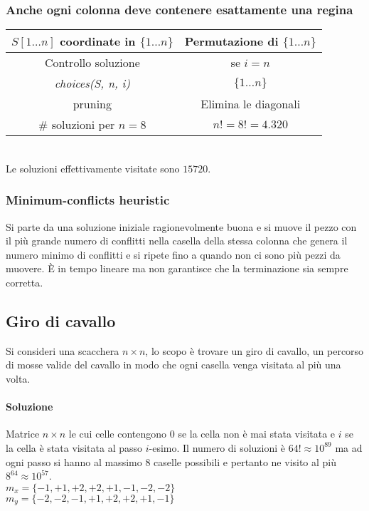 \subsubsection{Anche ogni colonna deve contenere esattamente una regina}
\begin{tabular}{|c|c|}
	\hline
	$S[1\dots n]$ coordinate in $\{1\dots n\}$ & Permutazione di $\{1\dots n\}$\\
	\hline
	Controllo soluzione & se $i = n$ \\
	\hline
	\emph{choices(S, n, i)} & $\{1\dots n\}$\\
	\hline
	pruning & Elimina le diagonali\\
	\hline
	$\#$ soluzioni per $n=8$ & $n! = 8! = 4.320$\\
	\hline
\end{tabular}\\
Le soluzioni effettivamente visitate sono $15720$.
\subsubsection{Minimum-conflicts heuristic}
Si parte da una soluzione iniziale ragionevolmente buona e si muove il pezzo con il pi\`u grande numero di conflitti nella casella della stessa colonna che genera il numero minimo di 
conflitti e si ripete fino a quando non ci sono pi\`u pezzi da muovere. \`E in tempo lineare ma non garantisce che la terminazione sia sempre corretta.\\

\subsection{Giro di cavallo}
Si consideri una scacchera $n\times n$, lo scopo \`e trovare un giro di cavallo, un percorso di mosse valide del cavallo in modo che ogni casella venga visitata al pi\`u una volta.
\paragraph{Soluzione}
Matrice $n\times n$ le cui celle contengono $0$ se la cella non \`e mai stata visitata e $i$ se la cella \`e stata visitata al passo $i$-esimo. Il numero di soluzioni \`e 
$64!\approx 10^{89}$ ma ad ogni passo si hanno al massimo $8$ caselle possibili e pertanto ne visito al pi\`u $8^{64}\approx 10^{57}$.\\




$m_x = \{-1, +1, +2, +2, +1, -1, -2, -2\}$\\
$m_y = \{-2, -2, -1, +1, +2, +2, +1, -1\}$
\newpage
